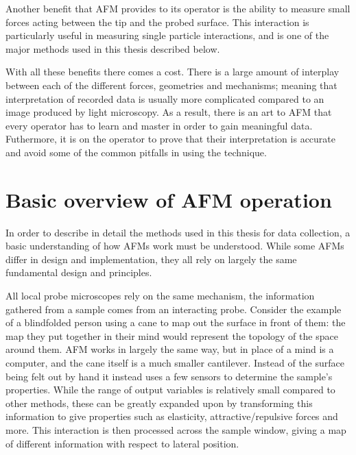 Another benefit that AFM provides to its operator is the ability to measure small forces acting between the tip and the probed surface. This interaction is particularly useful in measuring single particle interactions, and is one of the major methods used in this thesis described below.


With all these benefits there comes a cost. There is a large amount of interplay between each of the different forces, geometries and mechanisms; meaning that interpretation of recorded data is usually more complicated compared to an image produced by light microscopy. As a result, there is an art to AFM that every operator has to learn and master in order to gain meaningful data. Futhermore, it is on the operator to prove that their interpretation is accurate and avoid some of the common pitfalls in using the technique.

\section{Basic overview of AFM operation}

In order to describe in detail the methods used in this thesis for data collection, a basic understanding of how AFMs work must be understood. While some AFMs differ in design and implementation, they all rely on largely the same fundamental design and principles. 

All local probe microscopes rely on the same mechanism, the information gathered from a sample comes from an interacting probe. Consider the example of a blindfolded person using a cane to map out the surface in front of them: the map they put together in their mind would represent the topology of the space around them. AFM works in largely the same way, but in place of a mind is a computer, and the cane itself is a much smaller cantilever. Instead of the surface being felt out by hand it instead uses a few sensors to determine the sample's properties. While the range of output variables is relatively small compared to other methods, these can be greatly expanded upon by transforming this information to give properties such as elasticity, attractive/repulsive forces and more. This interaction is then processed across the sample window, giving a map of different information with respect to lateral position.

